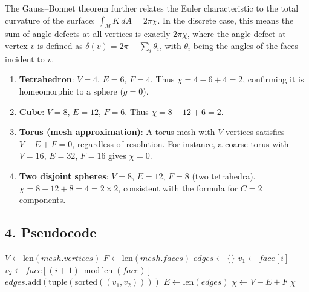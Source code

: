 The Gauss--Bonnet theorem further relates the Euler characteristic to the total curvature of the surface: $\int_M K \, dA = 2\pi \chi$. In the discrete case, this means the sum of angle defects at all vertices is exactly $2\pi \chi$, where the angle defect at vertex $v$ is defined as $\delta(v) = 2\pi - \sum_{i} \theta_i$, with $\theta_i$ being the angles of the faces incident to $v$.

\begin{example}\label{ex:euler_characteristic}
\begin{enumerate}
    \item \textbf{Tetrahedron}: $V = 4$, $E = 6$, $F = 4$. Thus $\chi = 4 - 6 + 4 = 2$, confirming it is homeomorphic to a sphere ($g = 0$).
    \item \textbf{Cube}: $V = 8$, $E = 12$, $F = 6$. Thus $\chi = 8 - 12 + 6 = 2$.
    \item \textbf{Torus (mesh approximation)}: A torus mesh with $V$ vertices satisfies $V - E + F = 0$, regardless of resolution. For instance, a coarse torus with $V = 16$, $E = 32$, $F = 16$ gives $\chi = 0$.
    \item \textbf{Two disjoint spheres}: $V = 8$, $E = 12$, $F = 8$ (two tetrahedra). $\chi = 8 - 12 + 8 = 4 = 2 \times 2$, consistent with the formula for $C = 2$ components.
\end{enumerate}
\end{example}

\subsection{4. Pseudocode}

\begin{algorithm}
\caption{Calculate Euler Characteristic}
\label{alg:calculate_euler_characteristic}
\begin{algorithmic}[1]
    \State $V \gets \text{len}(mesh.\mathit{vertices})$
    \State $F \gets \text{len}(mesh.\mathit{faces})$
    \State $\mathit{edges} \gets \{\}$
            \State $v_1 \gets \mathit{face}[i]$
            \State $v_2 \gets \mathit{face}[(i+1) \bmod \text{len}(\mathit{face})]$
            \State $\mathit{edges}.\text{add}(\text{tuple}(\text{sorted}((v_1, v_2))))$
        \EndFor
    \EndFor
    \State $E \gets \text{len}(\mathit{edges})$
    \State $\chi \gets V - E + F$
    \State \Return $\chi$
\EndFunction
\end{algorithmic}
\end{algorithm}

